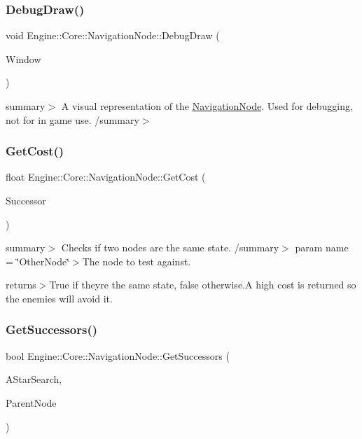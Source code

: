 \subsubsection{\texorpdfstring{Debug\+Draw()}{DebugDraw()}}
{\footnotesize\ttfamily void Engine\+::\+Core\+::\+Navigation\+Node\+::\+Debug\+Draw (\begin{DoxyParamCaption}\item[{shared\+\_\+ptr$<$ Render\+Window $>$}]{Window }\end{DoxyParamCaption})}

summary$>$ A visual representation of the \hyperlink{struct_engine_1_1_core_1_1_navigation_node}{Navigation\+Node}. Used for debugging, not for in game use. /summary$>$ \mbox{\label{struct_engine_1_1_core_1_1_navigation_node_a2d2f49adb68c3b880b750875ad15a50b}} 
\subsubsection{\texorpdfstring{Get\+Cost()}{GetCost()}}
{\footnotesize\ttfamily float Engine\+::\+Core\+::\+Navigation\+Node\+::\+Get\+Cost (\begin{DoxyParamCaption}\item[{\hyperlink{struct_engine_1_1_core_1_1_navigation_node}{Navigation\+Node} \&}]{Successor }\end{DoxyParamCaption})}

summary$>$ Checks if two nodes are the same state. /summary$>$ param name = \char`\"{}\+Other\+Node\char`\"{}$>$The node to test against.

returns$>$True if they\textquotesingle{}re the same state, false otherwise.A high cost is returned so the enemies will avoid it. \mbox{\label{struct_engine_1_1_core_1_1_navigation_node_a4e049fbcda1bb269303da91692d05033}} 
\subsubsection{\texorpdfstring{Get\+Successors()}{GetSuccessors()}}
{\footnotesize\ttfamily bool Engine\+::\+Core\+::\+Navigation\+Node\+::\+Get\+Successors (\begin{DoxyParamCaption}\item[{\hyperlink{class_a_star_search}{A\+Star\+Search}$<$ \hyperlink{struct_engine_1_1_core_1_1_navigation_node}{Navigation\+Node} $>$ $\ast$}]{A\+Star\+Search,  }\item[{\hyperlink{struct_engine_1_1_core_1_1_navigation_node}{Navigation\+Node} $\ast$}]{Parent\+Node }\end{DoxyParamCaption})}

